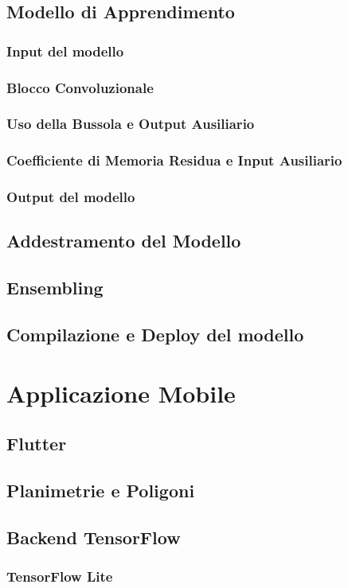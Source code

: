 \documentclass[12pt]{report}
\begin{document}
\section{Modello di Apprendimento}
\subsection{Input del modello}
\subsection{Blocco Convoluzionale}
\subsection{Uso della Bussola e Output Ausiliario}
\subsection{Coefficiente di Memoria Residua e Input Ausiliario}
\subsection{Output del modello}
\section{Addestramento del Modello}
\section{Ensembling}
\section{Compilazione e Deploy del modello}

\chapter{Applicazione Mobile}
\section{Flutter}
\section{Planimetrie e Poligoni}
\section{Backend TensorFlow}
\subsection{TensorFlow Lite}
\end{document}
